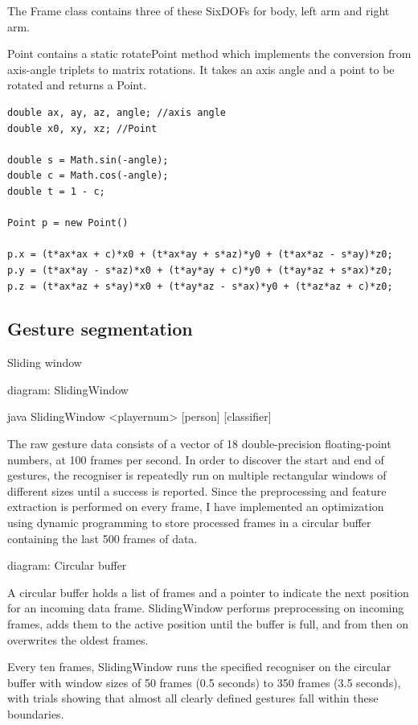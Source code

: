 \documentclass[12pt,a4,notitlepage]{report}
\renewcommand{\_}{\texttt{\symbol{95}}}
\newcommand{\<}{\texttt{\symbol{60}}}
\renewcommand{\>}{\texttt{\symbol{62}}}
\begin{document}
The Frame class contains three of these SixDOFs for body, left arm and right arm.

Point contains a static rotatePoint method which implements the conversion from axis-angle triplets to matrix rotations. It takes an axis angle and a point to be rotated and returns a Point.

\begin{verbatim}
double ax, ay, az, angle; //axis angle
double x0, xy, xz; //Point

double s = Math.sin(-angle);
double c = Math.cos(-angle);
double t = 1 - c;

Point p = new Point()

p.x = (t*ax*ax + c)*x0 + (t*ax*ay + s*az)*y0 + (t*ax*az - s*ay)*z0;
p.y = (t*ax*ay - s*az)*x0 + (t*ay*ay + c)*y0 + (t*ay*az + s*ax)*z0;
p.z = (t*ax*az + s*ay)*x0 + (t*ay*az - s*ax)*y0 + (t*az*az + c)*z0;
\end{verbatim}

\subsection{Gesture segmentation}

Sliding window

{diagram: SlidingWindow}

java SlidingWindow <playernum> [person] [classifier]

The raw gesture data consists of a vector of 18 double-precision floating-point numbers, at 100 frames per second. In order to discover the start and end of gestures, the recogniser is repeatedly run on multiple rectangular windows of different sizes until a success is reported. Since the preprocessing and feature extraction is performed on every frame, I have implemented an optimization using dynamic programming to store processed frames in a circular buffer containing the last 500 frames of data.

{diagram: Circular buffer}

A circular buffer holds a list of frames and a pointer to indicate the next position for an incoming data frame. SlidingWindow performs preprocessing on  incoming frames, adds them to the active position until the buffer is full, and from then on overwrites the oldest frames.

Every ten frames, SlidingWindow runs the specified recogniser on the circular buffer with window sizes of 50 frames (0.5 seconds) to 350 frames (3.5 seconds), with trials showing that almost all clearly defined gestures fall within these boundaries.
\end{document}
